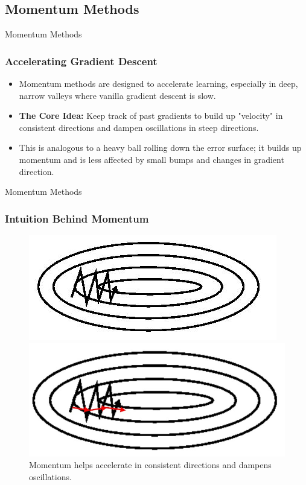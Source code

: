 \subsection{Momentum Methods}

\begin{frame}{Momentum Methods}
    \frametitle{Accelerating Gradient Descent}
    \begin{itemize}
        \item Momentum methods are designed to accelerate learning, especially in deep, narrow valleys where vanilla gradient descent is slow.
        \item \textbf{The Core Idea:} Keep track of past gradients to build up "velocity" in consistent directions and dampen oscillations in steep directions.
        \item This is analogous to a heavy ball rolling down the error surface; it builds up momentum and is less affected by small bumps and changes in gradient direction.
    \end{itemize}

\end{frame}

\begin{frame}{Momentum Methods}
    \frametitle{Intuition Behind Momentum}
    \begin{figure}
        \centering
        \begin{minipage}{0.5\textwidth}
            \centering
            \includegraphics[width=\textwidth]{images/before_momentum.jpeg}
        \end{minipage}%
            \begin{minipage}{0.5\textwidth}
            \centering
            \includegraphics[width=\textwidth]{images/after_momentum.jpg}
        \end{minipage}
        \caption*{Momentum helps accelerate in consistent directions and dampens oscillations.}
    \end{figure}
\end{frame}

